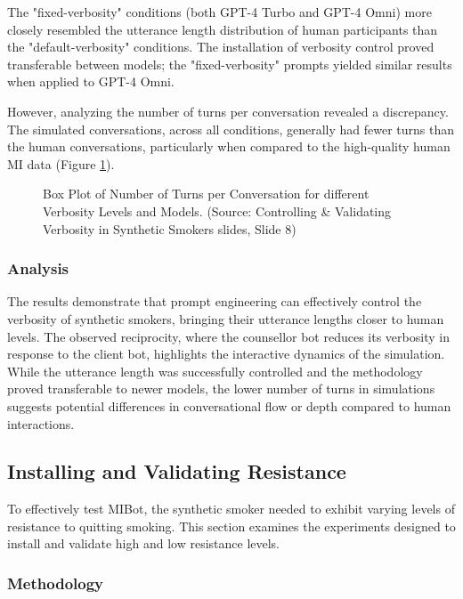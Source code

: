 The "fixed-verbosity" conditions (both GPT-4 Turbo and GPT-4 Omni) more closely resembled the utterance length distribution of human participants than the "default-verbosity" conditions. The installation of verbosity control proved transferable between models; the "fixed-verbosity" prompts yielded similar results when applied to GPT-4 Omni.

However, analyzing the number of turns per conversation revealed a discrepancy. The simulated conversations, across all conditions, generally had fewer turns than the human conversations, particularly when compared to the high-quality human MI data (Figure \ref{fig:verbosity_num_turns}).

\begin{figure}[h]
    \centering
    \caption{Box Plot of Number of Turns per Conversation for different Verbosity Levels and Models. (Source: Controlling \& Validating Verbosity in Synthetic Smokers slides, Slide 8)}
    \label{fig:verbosity_num_turns}
\end{figure}

\subsubsection{Analysis}

The results demonstrate that prompt engineering can effectively control the verbosity of synthetic smokers, bringing their utterance lengths closer to human levels. The observed reciprocity, where the counsellor bot reduces its verbosity in response to the client bot, highlights the interactive dynamics of the simulation. While the utterance length was successfully controlled and the methodology proved transferable to newer models, the lower number of turns in simulations suggests potential differences in conversational flow or depth compared to human interactions.

\subsection{Installing and Validating Resistance}

To effectively test MIBot, the synthetic smoker needed to exhibit varying levels of resistance to quitting smoking. This section examines the experiments designed to install and validate high and low resistance levels.

\subsubsection{Methodology}

